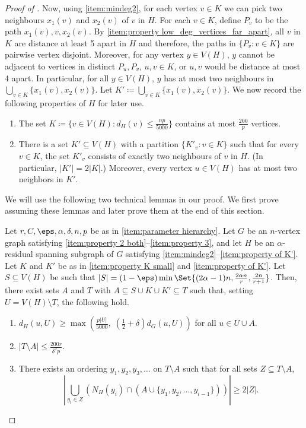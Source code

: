 \documentclass[10pt,a4paper,reqno]{amsart}
\begin{document}
\begin{proof}[Proof of ]
Now, using \ref{item:mindeg2}, for each vertex $v \in K$ we can pick two neighbours $x_1(v)$ and $x_2(v)$ of $v$ in $H$. For each $v \in K$, define $P_v$ to be the path $x_1(v),v,x_2(v)$. By \ref{item:property low_deg_vertices_far_apart}, all $v$ in $K$ are distance at least 5 apart in $H$ and therefore, the paths in $\{P_v: v \in K\}$ are pairwise vertex disjoint. Moreover, for any vertex $y \in V(H)$, $y$ cannot be adjacent to vertices in distinct $P_u,P_v$, $u,v \in K$, or $u,v$ would be distance at most 4 apart. In particular, for all $y \in V(H)$, $y$ has at most two neighbours in $\bigcup_{v\in K}\{x_1(v),x_2(v)\}$. Let $K' \coloneqq \bigcup_{v\in K}\{x_1(v),x_2(v)\}$.
We now record the following properties of $H$ for later use.
\begin{enumerate}[leftmargin=*, label = {\bfseries A\arabic{enumi}}, start=3]
    \item The set $K \coloneqq \{v \in V(H): d_H(v) \le \frac{np}{5000}\}$ contains at most $\frac{200}{p}$ vertices.
    \label{item:property K small}
    \item There is a set $K'\subseteq V(H)$ with a partition $\{K'_v: v\in K\}$ such that for every $v\in K$, the set $K'_v$ consists of exactly two neighbours of $v$ in $H$. (In particular, $|K'|=2|K|$.) Moreover, every vertex $u\in V(H)$ has at most two neighbors in $K'$.
    \label{item:property of K'}
\end{enumerate}
We will use the following two technical lemmas in our proof. We first prove  assuming these lemmas and later prove them at the end of this section.

\begin{lemma}\label{lem:combined}
Let $r,C,\eps,\alpha,\delta,n,p$ be as in \ref{item:parameter hierarchy}.
Let $G$ be an $n$-vertex graph satisfying \ref{item:property 2 both}--\ref{item:property 3}, and let $H$ be an $\alpha$-residual spanning subgraph of $G$ satisfying \ref{item:mindeg2}--\ref{item:property of K'}. Let $K$ and $K'$ be as in \ref{item:property K small} and \ref{item:property of K'}.
Let $S \subseteq V(H)$ be such that $|S| = (1-\eps) \min\Set{(2\alpha - 1)n, \frac{2\alpha n}{r}, \frac{2n}{r+1}}$.
Then, there exist sets $A$ and $T$ with $A\subseteq S \cup K \cup K' \subseteq T$ such that, setting $U = V(H)\setminus T$, the following hold. 
\begin{enumerate}[leftmargin=*,label = {\bfseries C\arabic{enumi}}]
    \item
    $d_{H}\left(u,U\right) \ge \max\left(\frac{p|U|}{5000}, \; \left(\frac{1}{2}+\delta\right)d_{G}\left(u,U\right)\right)$ for all $u \in U\cup A$. 
   \label{item:degree_in_unused_part}
    \item $|T\setminus A| \le \frac{200r}{\delta^2 p}.$ 
    \label{item:size_SminusA}
    \item There exists an ordering $y_1,y_2,y_3,\ldots $ on $T \setminus A$ such that for all sets $Z \subseteq T \setminus A$,
    \[\left|\bigcup_{y_i \in Z} (N_H(y_i) \cap (A \cup \{y_1,y_2,\ldots,y_{i-1}\}))\right| \ge 2|Z|.\] \label{item:Hall's condition}
\end{enumerate}
\end{lemma}


\end{proof}
\end{document}
